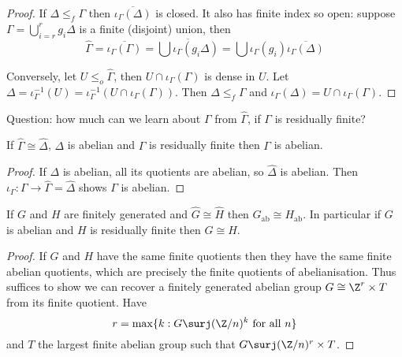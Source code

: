 \documentclass[a4paper]{article}
\begin{document}
\begin{proof}
  If \(\Delta \leq_f \Gamma\) then \(\overline{\iota_\Gamma(\Delta)}\) is closed. It also has finite index so open: suppose \(\Gamma = \bigcup_{i = r}^r g_i \Delta\) is a finite (disjoint) union, then
  \[
    \hat \Gamma = \overline{\iota_\Gamma(\Gamma)}
    = \overline{\bigcup \iota_\Gamma(g_i \Delta)}
    = \bigcup \iota_\Gamma(g_i) \overline{\iota_\Gamma(\Delta)}
  \]

  Conversely, let \(U \leq_o \hat \Gamma\), then \(U \cap \iota_\Gamma(\Gamma)\) is dense in \(U\). Let \(\Delta = \iota_\Gamma^{-1}(U) = \iota_\Gamma^{-1}(U \cap \iota_\Gamma(\Gamma))\). Then \(\Delta \leq_f \Gamma\) and \(\iota_\Gamma(\Delta) = U \cap \iota_\Gamma(\Gamma)\).
\end{proof}


Question: how much can we learn about \(\Gamma\) from \(\hat \Gamma\), if \(\Gamma\) is residually finite?

\begin{proposition}
  If \(\hat \Gamma \cong \hat \Delta\), \(\Delta\) is abelian and \(\Gamma\) is residually finite then \(\Gamma\) is abelian.
\end{proposition}

\begin{proof}
  If \(\Delta\) is abelian, all its quotients are abelian, so \(\hat \Delta\) is abelian. Then \(\iota_\Gamma: \Gamma \to \hat \Gamma = \hat \Delta\) shows \(\Gamma\) is abelian.
\end{proof}

\begin{proposition}
  If \(G\) and \(H\) are finitely generated and \(\hat G \cong \hat H\) then \(G_{\mathrm{ab}} \cong H_{\mathrm{ab}}\). In particular if \(G\) is abelian and \(H\) is residually finite then \(G \cong H\).
\end{proposition}

\begin{proof}
  If \(G\) and \(H\) have the same finite quotients then they have the same finite abelian quotients, which are precisely the finite quotients of abelianisation. Thus suffices to show we can recover a finitely generated abelian group \(G \cong \Z^r \times T\) from its finite quotient. Have
  \[
    r = \max\{k: G \surj (\Z/n)^k \text{ for all } n\}
  \]
  and \(T\) the largest finite abelian group such that \(G \surj (\Z/n)^r \times T\).
\end{proof}
\end{document}
